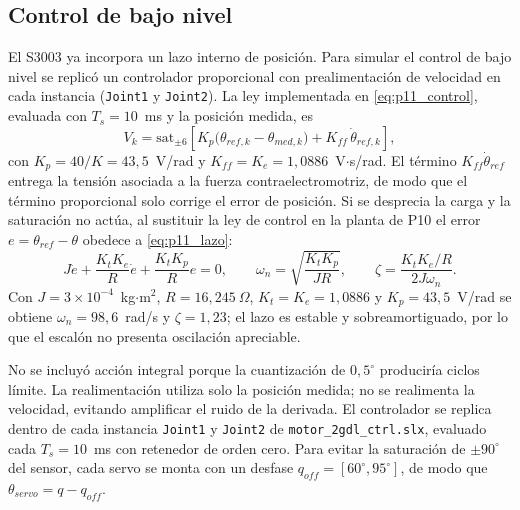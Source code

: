 \subsection{Control de bajo nivel}

El S3003 ya incorpora un lazo interno de posición. Para simular el control de
bajo nivel se replicó un controlador proporcional con prealimentación de
velocidad en cada instancia (\texttt{Joint1} y \texttt{Joint2}). La ley
implementada en \eqref{eq:p11_control}, evaluada con $T_s=10$~ms y la posición
medida, es
\begin{equation}
\label{eq:p11_control}
V_k=\mathrm{sat}_{\pm 6}\!\left[K_p\big(\theta_{ref,k}-\theta_{med,k}\big)
+K_{ff}\,\dot{\theta}_{ref,k}\right],
\end{equation}
con $K_p=40/K=43{,}5$~V/rad y $K_{ff}=K_e=1{,}0886$~V$\cdot$s/rad. El
término $K_{ff}\dot\theta_{ref}$ entrega la tensión asociada a la fuerza
contraelectromotriz, de modo que el término proporcional solo corrige el error
de posición. Si se desprecia la carga y la saturación no actúa, al sustituir la
ley de control en la planta de P10 el error $e=\theta_{ref}-\theta$ obedece a
\eqref{eq:p11_lazo}:
\begin{equation}
\label{eq:p11_lazo}
J\ddot e+\frac{K_tK_e}{R}\dot e+\frac{K_tK_p}{R}e=0,
\qquad
\omega_n=\sqrt{\frac{K_tK_p}{JR}},
\qquad
\zeta=\frac{K_tK_e/R}{2J\omega_n}.
\end{equation}
Con $J=3\times10^{-4}$~kg$\cdot$m$^2$, $R=16{,}245~\Omega$,
$K_t=K_e=1{,}0886$ y $K_p=43{,}5$~V/rad se obtiene
$\omega_n=98{,}6$~rad/s y $\zeta=1{,}23$; el lazo es estable y
sobreamortiguado, por lo que el escalón no presenta oscilación apreciable.

No se incluyó acción integral porque la cuantización de $0{,}5^\circ$
produciría ciclos límite. La realimentación utiliza solo la posición medida;
no se realimenta la velocidad, evitando amplificar el ruido de la derivada. El
controlador se replica dentro de cada instancia \texttt{Joint1} y
\texttt{Joint2} de \texttt{motor\_2gdl\_ctrl.slx}, evaluado cada
$T_s=10$~ms con retenedor de orden cero. Para evitar la saturación de
$\pm90^\circ$ del sensor, cada servo se monta con un desfase
$q_{off}=[60^\circ,95^\circ]$, de modo que $\theta_{servo}=q-q_{off}$.

